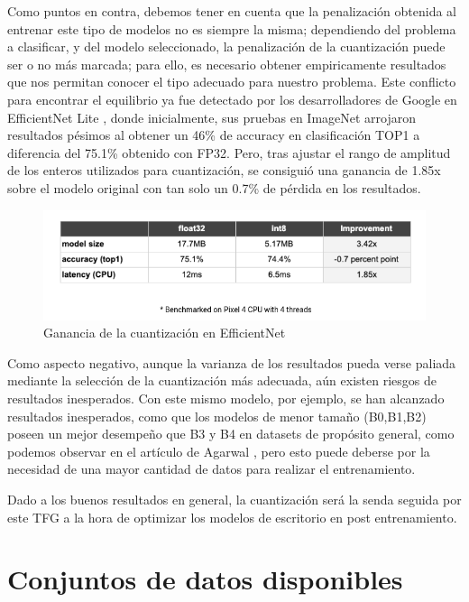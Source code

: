 Como puntos en contra, debemos tener en cuenta que la penalización obtenida al entrenar este tipo de modelos no es siempre la misma; dependiendo del problema a clasificar, y del modelo seleccionado, la penalización de la cuantización puede ser o no más marcada; para ello, es necesario obtener empiricamente resultados que nos permitan conocer el tipo adecuado para nuestro problema. Este conflicto para encontrar el equilibrio ya fue detectado por los desarrolladores de Google en EfficientNet Lite \cite{eflite,eflite2}, donde inicialmente, sus pruebas en ImageNet arrojaron resultados pésimos al obtener un 46\% de accuracy en clasificación TOP1 a diferencia del 75.1\% obtenido con FP32. Pero, tras ajustar el rango de amplitud de los enteros utilizados para cuantización, se consiguió una ganancia de 1.85x sobre el modelo original con tan solo un 0.7\% de pérdida en los resultados.

\begin{figure}[H]

	\centering
	\includegraphics[scale = 0.35]{imagenes/gananciacuant.png}
	\caption{Ganancia de la cuantización en EfficientNet}
	\label{gananciacuant}
\end{figure}

Como aspecto negativo, aunque la varianza de los resultados pueda verse paliada mediante la selección de la cuantización más adecuada, aún existen riesgos de resultados inesperados. Con este mismo modelo, por ejemplo, se han alcanzado resultados inesperados, como que los modelos de menor tamaño (B0,B1,B2) poseen un mejor desempeño que B3 y B4 en datasets de propósito general, como podemos observar en el artículo de Agarwal  \cite{efliteworse}, pero esto puede deberse por la necesidad de una mayor cantidad de datos para realizar el entrenamiento.

Dado a los buenos resultados en general, la cuantización será la senda seguida por este TFG a la hora de optimizar los modelos de escritorio en post entrenamiento.


\newpage
\section{Conjuntos de datos disponibles}

